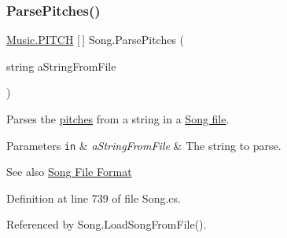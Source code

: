 \subsubsection{\texorpdfstring{Parse\+Pitches()}{ParsePitches()}}
{\footnotesize\ttfamily \hyperlink{group___music_enums_ga508f69b199ea518f935486c990edac1d}{Music.\+P\+I\+T\+CH} \mbox{[}$\,$\mbox{]} Song.\+Parse\+Pitches (\begin{DoxyParamCaption}\item[{string}]{a\+String\+From\+File }\end{DoxyParamCaption})\hspace{0.3cm}{\ttfamily [private]}}



Parses the \hyperlink{group___music_enums_ga508f69b199ea518f935486c990edac1d}{pitches} from a string in a \hyperlink{group___song_group_DocSongFileFormat}{Song file}. 


\begin{DoxyParams}[1]{Parameters}
\mbox{\tt in}  & {\em a\+String\+From\+File} & The string to parse. \\
\hline
\end{DoxyParams}
\begin{DoxySeeAlso}{See also}
\hyperlink{group___song_group_DocSongFileFormat}{Song File Format} 
\end{DoxySeeAlso}


Definition at line 739 of file Song.\+cs.



Referenced by Song.\+Load\+Song\+From\+File().


